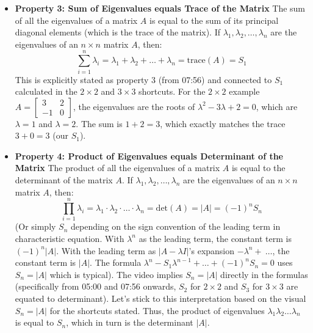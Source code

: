 \documentclass{article}
\begin{document}
\begin{itemize}
    \item \textbf{Property 3: Sum of Eigenvalues equals Trace of the Matrix}
    The sum of all the eigenvalues of a matrix $A$ is equal to the sum of its principal diagonal elements (which is the trace of the matrix).
    If $\lambda_1, \lambda_2, \dots, \lambda_n$ are the eigenvalues of an $n \times n$ matrix $A$, then:
    \[ \sum_{i=1}^{n} \lambda_i = \lambda_1 + \lambda_2 + \dots + \lambda_n = \text{trace}(A) = S_1 \]
    This is explicitly stated as property 3 (from 07:56) and connected to $S_1$ calculated in the $2 \times 2$ and $3 \times 3$ shortcuts. For the $2 \times 2$ example $A = \begin{bmatrix} 3 & 2 \\ -1 & 0 \end{bmatrix}$, the eigenvalues are the roots of $\lambda^2 - 3\lambda + 2=0$, which are $\lambda=1$ and $\lambda=2$. The sum is $1+2=3$, which exactly matches the trace $3+0=3$ (our $S_1$).

    \item \textbf{Property 4: Product of Eigenvalues equals Determinant of the Matrix}
    The product of all the eigenvalues of a matrix $A$ is equal to the determinant of the matrix $A$.
    If $\lambda_1, \lambda_2, \dots, \lambda_n$ are the eigenvalues of an $n \times n$ matrix $A$, then:
    \[ \prod_{i=1}^{n} \lambda_i = \lambda_1 \cdot \lambda_2 \cdot \dots \cdot \lambda_n = \text{det}(A) = |A| = (-1)^n S_n \]
     (Or simply $S_n$ depending on the sign convention of the leading term in characteristic equation. With $\lambda^n$ as the leading term, the constant term is $(-1)^n |A|$. With the leading term as $|A - \lambda I|$'s expansion $-\lambda^n + \ \dots$, the constant term is $|A|$. The formula $\lambda^n - S_1\lambda^{n-1} + \dots + (-1)^n S_n = 0$ uses $S_n = |A|$ which is typical). The video implies $S_n = |A|$ directly in the formulas (specifically from 05:00 and 07:56 onwards, $S_2$ for $2 \times 2$ and $S_3$ for $3 \times 3$ are equated to determinant). Let's stick to this interpretation based on the visual $S_n = |A|$ for the shortcuts stated.
    Thus, the product of eigenvalues $\lambda_1 \lambda_2 \dots \lambda_n$ is equal to $S_n$, which in turn is the determinant $|A|$.


\end{itemize}
\end{document}
